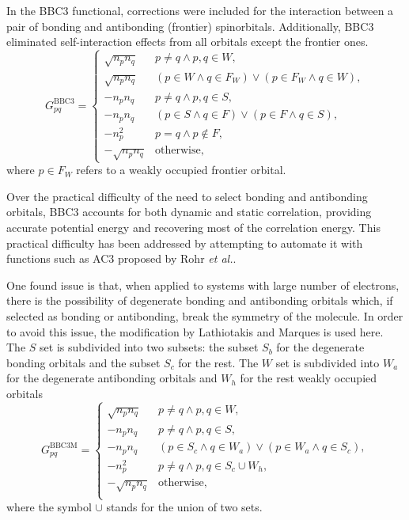 In the BBC3 functional, corrections were included for the interaction between a pair 
of bonding and antibonding (frontier) spinorbitals.
Additionally, BBC3 eliminated self-interaction effects from all orbitals except
the frontier ones.
\begin{equation} \label{eq:GBBC3}
    G_{pq}^{\text{BBC3}} =
    \begin{cases}
        \sqrt{n_p n_q} &
        p\not=q \wedge p,q \in W,
        \\
        \sqrt{n_p n_q} &
        \left( p \in W \wedge q \in F_W \right) \vee
        \left( p \in F_W \wedge q \in W \right),
        \\
        -n_p n_q &
        p\not=q \wedge p,q \in S,
        \\
        -n_p n_q &
        \left( p \in S \wedge q \in F \right) \vee
        \left( p \in F \wedge q \in S \right),
        \\
        -n_p^{2} & p=q \wedge p\not\in F, \\
        - \sqrt{n_p n_q} & \text{otherwise},
    \end{cases}
\end{equation}
where $p \in F_W$ refers to a weakly occupied frontier orbital.

Over the practical difficulty of the need to select bonding and antibonding
orbitals, BBC3 accounts for both dynamic and static correlation, providing 
accurate potential energy and recovering most of the correlation energy. 
This practical difficulty has been addressed by attempting to automate it with
functions such as AC3 proposed by Rohr \textit{et al.}.

One found issue is that, when applied to systems with large number of
electrons, there is the possibility of degenerate bonding and antibonding
orbitals which, if selected as bonding or antibonding, break the symmetry
of the molecule.
In order to avoid this issue, the modification by Lathiotakis and 
Marques is used here.
The $S$ set is subdivided into
two subsets: the subset $S_b$ for the degenerate bonding orbitals and the subset
$S_c$ for the rest. The $W$ set is subdivided into $W_a$ for the degenerate
antibonding orbitals and $W_h$ for the rest weakly occupied orbitals
\begin{equation} \label{eq:GBBC3M}
    G_{pq}^{\text{BBC3M}} = 
    \begin{cases}
        \sqrt{n_p n_q} & p \not= q \wedge p,q \in W, \\
        -n_p n_q & p \not= q \wedge p,q \in S, \\
        -n_p n_q & \left( p \in S_c \wedge q \in W_a \right) \vee \left( p \in W_a \wedge q \in S_c \right), \\
        -n_p^{2} & p \not= q \wedge p,q \in S_c \cup W_h, \\
        -\sqrt{n_p n_q} & \text{otherwise}, \\
    \end{cases}
\end{equation}
where the symbol $\cup$ stands for the union of two sets.

